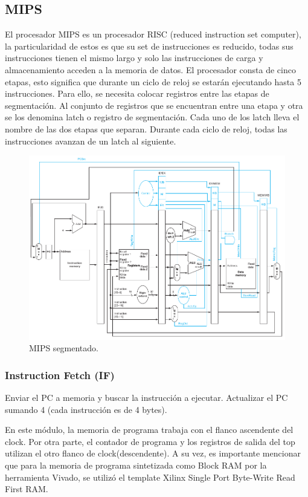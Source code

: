 \documentclass[12pt,A4paper,titlepage]{article}
\begin{document}
\subsection{MIPS}
El procesador MIPS es un procesador RISC (reduced instruction set computer), la particularidad de estos es que su set de instrucciones es reducido, todas sus instrucciones tienen el mismo largo y solo las instrucciones de carga y almacenamiento acceden a la memoria de datos. El procesador consta de cinco etapas, esto significa que durante un ciclo de reloj se estarán ejecutando hasta 5 instrucciones. Para ello, se necesita colocar registros entre las etapas de segmentación. Al conjunto de registros que se encuentran entre una etapa y otra se los denomina latch o registro de segmentación. Cada uno de los latch lleva el nombre de las dos etapas que separan. Durante cada ciclo de reloj, todas las instrucciones avanzan de un latch al siguiente.

\begin{figure} [H]
    \centering
    \includegraphics[width=\textwidth]{figure/figure451-mips-segmentado.png}
    \caption{MIPS segmentado.}
    \label{fig:mips-complete}
\end{figure}

\subsubsection{Instruction Fetch (IF)}
Enviar el PC a memoria y buscar la instrucción a ejecutar. Actualizar el PC sumando 4 (cada instrucción es de 4 bytes).

En este módulo, la memoria de programa trabaja con el flanco ascendente del clock.
Por otra parte, el contador de programa y los registros de salida del top utilizan el otro flanco
de clock(descendente).
A su vez, es importante mencionar que para la memoria de programa sintetizada
como Block RAM por la herramienta Vivado, se utilizó el template Xilinx Single Port
Byte-Write Read First RAM.
\end{document}
